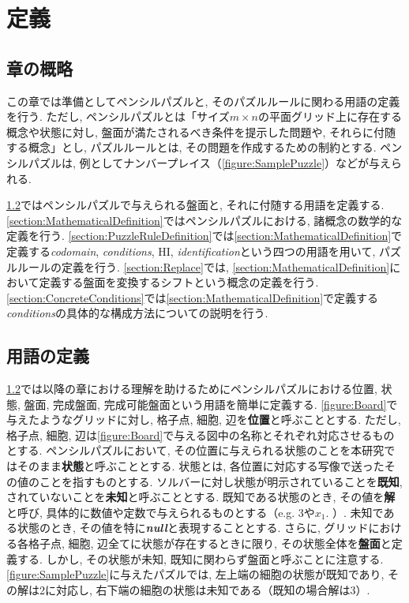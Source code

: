 \chapter{定義}\label{chapter:Prepare}
\section{章の概略}\label{section:Outline}
この章では準備としてペンシルパズルと, そのパズルルールに関わる用語の定義を行う. ただし, ペンシルパズルとは「サイズ$m\times n$の平面グリッド上に存在する概念や状態に対し, 盤面が満たされるべき条件を提示した問題や, それらに付随する概念」とし, パズルルールとは, その問題を作成するための制約とする.
ペンシルパズルは, 例としてナンバープレイス（\cref{figure:SamplePuzzle}）などが与えられる.

\cref{section:WordDefinition}ではペンシルパズルで与えられる盤面と, それに付随する用語を定義する.
\cref{section:MathematicalDefinition}ではペンシルパズルにおける, 諸概念の数学的な定義を行う.
\cref{section:PuzzleRuleDefinition}では\cref{section:MathematicalDefinition}で定義する\textit{codomain}, \textit{conditions}, HI, \textit{identification}という四つの用語を用いて, パズルルールの定義を行う.
\cref{section:Replace}では, \cref{section:MathematicalDefinition}において定義する盤面を変換するシフトという概念の定義を行う.
\cref{section:ConcreteConditions}では\cref{section:MathematicalDefinition}で定義する\textit{conditions}の具体的な構成方法についての説明を行う.

\section{用語の定義}\label{section:WordDefinition}
\cref{section:WordDefinition}では以降の章における理解を助けるためにペンシルパズルにおける位置, 状態, 盤面, 完成盤面, 完成可能盤面という用語を簡単に定義する. \cref{figure:Board}で与えたようなグリッドに対し, 格子点, 細胞, 辺を\textbf{位置}と呼ぶこととする. ただし, 格子点, 細胞, 辺は\cref{figure:Board}で与える図中の名称とそれぞれ対応させるものとする. ペンシルパズルにおいて, その位置に与えられる状態のことを本研究ではそのまま\textbf{状態}と呼ぶこととする. 状態とは, 各位置に対応する写像で送ったその値のことを指すものとする. ソルバーに対し状態が明示されていることを\textbf{既知}, されていないことを\textbf{未知}と呼ぶこととする. 既知である状態のとき, その値を\textbf{解}と呼び, 具体的に数値や定数で与えられるものとする（e.g. 3や$x_1$. ）. 未知である状態のとき, その値を特に\textbf{\textit{null}}と表現することとする. さらに, グリッドにおける各格子点, 細胞, 辺全てに状態が存在するときに限り, その状態全体を\textbf{盤面}と定義する. しかし, その状態が未知, 既知に関わらず盤面と呼ぶことに注意する. \cref{figure:SamplePuzzle}に与えたパズルでは, 左上端の細胞の状態が既知であり, その解は2に対応し, 右下端の細胞の状態は未知である（既知の場合解は3）.

